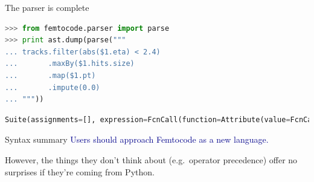 \documentclass{beamer}
\begin{document}
\begin{frame}[fragile]{The parser is complete}
\vspace{0.3 cm}
\begin{lstlisting}[language=python]
>>> from femtocode.parser import parse
>>> print ast.dump(parse("""
... tracks.filter(abs($1.eta) < 2.4)
...       .maxBy($1.hits.size)
...       .map($1.pt)
...       .impute(0.0)
... """))
\end{lstlisting}
\begin{lstlisting}[language=python,basicstyle=\ttfamily\scriptsize]
Suite(assignments=[], expression=FcnCall(function=Attribute(value=FcnCall(function=Attribute(value=FcnCall(function=Attribute(value=FcnCall(function=Attribute(value=Name(id='tracks', ctx=Load()), attr='filter', ctx=Load()), positional=[Compare(left=FcnCall(function=Name(id='abs', ctx=Load()), positional=[Attribute(value=AtArg(num=1), attr='eta', ctx=Load())], names=[], named=[]), ops=[Lt()], comparators=[Num(n=2.4)])], names=[], named=[]), attr='maxBy', ctx=Load()), positional=[Attribute(value=Attribute(value=AtArg(num=1), attr='hits', ctx=Load()), attr='size', ctx=Load())], names=[], named=[]), attr='map', ctx=Load()), positional=[Attribute(value=AtArg(num=1), attr='pt', ctx=Load())], names=[], named=[]), attr='impute', ctx=Load()), positional=[Num(n=0.0)], names=[], named=[]))
\end{lstlisting}
\end{frame}

\begin{frame}{Syntax summary}
\vspace{0.5 cm}
\textcolor{darkblue}{Users should approach Femtocode as a new language.}

\vspace{0.5 cm}
However, the things they don't think about (e.g.\ operator precedence) offer no surprises if they're coming from Python.

\vspace{0.5 cm}

\vspace{0.5 cm}

\vspace{0.5 cm}
\end{frame}
\end{document}
